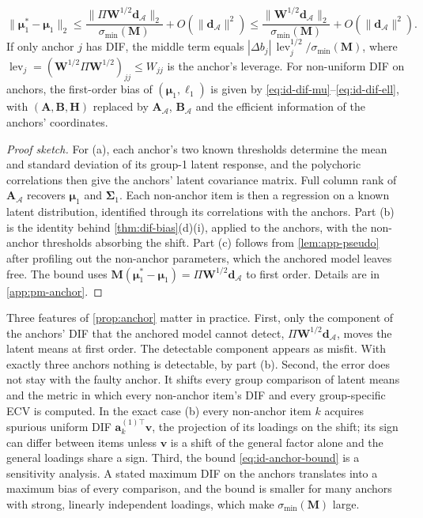 \begin{proposition}[Anchors]
\begin{enumerate}[(a)]
  \begin{equation}\label{eq:id-anchor-bound}
    \|\bm\mu_1^*-\bm\mu_1\|_2\le\frac{\|\Pi\bm W^{1/2}\bm d_{\mathcal A}\|_2}{\sigma_{\min}(\bm M)}+O(\|\bm d_{\mathcal A}\|^2)\le\frac{\|\bm W^{1/2}\bm d_{\mathcal A}\|_2}{\sigma_{\min}(\bm M)}+O(\|\bm d_{\mathcal A}\|^2).
  \end{equation}
  If only anchor $j$ has DIF, the middle term equals $|\Delta b_j|\,\operatorname{lev}_j^{1/2}/\sigma_{\min}(\bm M)$, where $\operatorname{lev}_j=(\bm W^{1/2}\Pi\bm W^{1/2})_{jj}\le W_{jj}$ is the anchor's leverage. For non-uniform DIF on anchors, the first-order bias of $(\bm\mu_1,\bm\ell_1)$ is given by \eqref{eq:id-dif-mu}--\eqref{eq:id-dif-ell}, with $(\bm A,\bm B,\bm H)$ replaced by $\bm A_{\mathcal A}$, $\bm B_{\mathcal A}$ and the efficient information of the anchors' coordinates.
\end{enumerate}
\end{proposition}

\begin{proof}[Proof sketch]
For (a), each anchor's two known thresholds determine the mean and standard deviation of its group-1 latent response, and the polychoric correlations then give the anchors' latent covariance matrix. Full column rank of $\bm A_{\mathcal A}$ recovers $\bm\mu_1$ and $\bm\Sigma_1$. Each non-anchor item is then a regression on a known latent distribution, identified through its correlations with the anchors. Part (b) is the identity behind \cref{thm:dif-bias}(d)(i), applied to the anchors, with the non-anchor thresholds absorbing the shift. Part (c) follows from \cref{lem:app-pseudo} after profiling out the non-anchor parameters, which the anchored model leaves free. The bound uses $\bm M(\bm\mu^*_1-\bm\mu_1)=\Pi\bm W^{1/2}\bm d_{\mathcal A}$ to first order. Details are in \cref{app:pm-anchor}.
\end{proof}

Three features of \cref{prop:anchor} matter in practice. First, only the component of the anchors' DIF that the anchored model cannot detect, $\Pi\bm W^{1/2}\bm d_{\mathcal A}$, moves the latent means at first order. The detectable component appears as misfit. With exactly three anchors nothing is detectable, by part (b). Second, the error does not stay with the faulty anchor. It shifts every group comparison of latent means and the metric in which every non-anchor item's DIF and every group-specific ECV is computed. In the exact case (b) every non-anchor item $k$ acquires spurious uniform DIF $\bm a_k^{(1)\top}\bm v$, the projection of its loadings on the shift; its sign can differ between items unless $\bm v$ is a shift of the general factor alone and the general loadings share a sign. Third, the bound \eqref{eq:id-anchor-bound} is a sensitivity analysis. A stated maximum DIF on the anchors translates into a maximum bias of every comparison, and the bound is smaller for many anchors with strong, linearly independent loadings, which make $\sigma_{\min}(\bm M)$ large.

